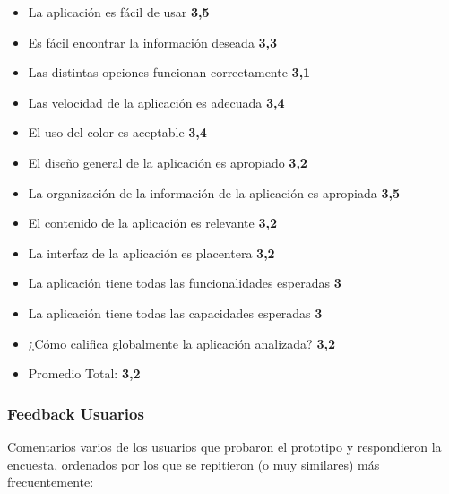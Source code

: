 \documentclass[10pt,letterpaper]{article}
\begin{document}
\begin{itemize}
\item La aplicación es fácil de usar \textbf{3,5}
\item Es fácil encontrar la información deseada \textbf{3,3}
\item Las distintas opciones funcionan correctamente \textbf{3,1}
\item Las velocidad de la aplicación es adecuada \textbf{3,4}
\item El uso del color es aceptable \textbf{3,4}
\item El diseño general de la aplicación es apropiado \textbf{3,2}
\item La organización de la información de la aplicación es apropiada \textbf{3,5}
\item El contenido de la aplicación es relevante \textbf{3,2}
\item La interfaz de la aplicación es placentera \textbf{3,2}
\item La aplicación tiene todas las funcionalidades esperadas \textbf{3}
\item La aplicación tiene todas las capacidades esperadas \textbf{3}
\item ¿Cómo califica globalmente la aplicación analizada? \textbf{3,2}

\item Promedio Total: \textbf{3,2}
\end{itemize}


\subsubsection{Feedback Usuarios}

Comentarios varios de los usuarios que probaron el prototipo y respondieron la encuesta, ordenados por los que se repitieron (o muy similares) más frecuentemente:\\
\end{document}
